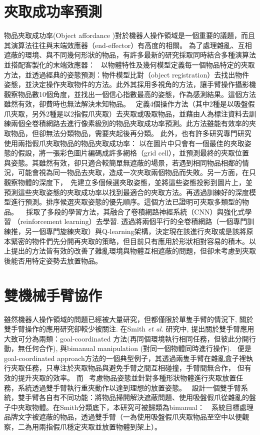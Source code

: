 \section{夾取成功率預測}
物品夾取成功率(Object affordance )對於機器人操作領域是一個重要的議題，而且其演算法往往與末端效應器（end-effector）有高度的相關。
為了處理雜亂、互相遮蔽的環境、與不同幾何形狀的物品，有許多最新的研究採取同時結合多種演算法並搭配客製化的末端效應器：
~\cite{zeng2016multi}以物體特性及幾何模型定義每一個物品特定的夾取方法，並透過經典的姿態預測：物件模型比對（object registration）去找出物件姿態，並決定操作夾取物件的方法。此外其採用多視角的方法，讓手臂操作攝影機觀察物品數10個角度，並找出一個信心指數最高的姿態，作為感測結果。這個方法雖然有效，卻費時也無法解決未知物品。
~\cite{zeng2018robotic}定義4個操作方法（其中2種是以吸盤假爪夾取，另外2種是以2指假爪夾取）去夾取或吸取物品，並藉由人為標注資料去訓練兩個全卷積網路去進行像素級別的物品夾取成功率預測。此方法雖能有效率的夾取物品，但卻無法分類物品，需要夾起後再分類。
此外，也有許多研究專門研究使用兩指假爪夾取物品的物品夾取成功率： \cite{redmon2015real} 以在圖片中只會有一個最佳的夾取姿態的假設，將一張彩色圖片編碼成許多網格（grid cell），並預測最終的夾取位置與姿態。其雖然有效，卻只適合較簡單無遮蔽的場景，若遇到相同物品相鄰的情況，可能會視為同一物品去夾取，造成一次夾取兩個物品而失敗。另一方面，在只觀察物體的深度下，~\cite{mahler2017dex}先建立多個候選夾取姿態，並將這些姿態投影到圖片上，並預測這些夾取姿態的夾取成功率以找到最適合的夾取方法。再透過訓練好的深度模型進行預測。排序候選夾取姿態的優先順序。這個方法已證明可夾取多類型的物品。
~\cite{pinto2016supersizing} 採取了多段的學習方法，其融合了卷積網路神經系統（CNN）與強化式學習 （reinforcement learning）去學習. \cite{zeng2018learning}透過將兩個平行的全卷積網路（一個專門訓練推，另一個專門旋練夾取）與Q-learning架構，決定現在該進行夾取或是該將原本緊密的物件們先分開再夾取的策略，但目前只有應用於形狀相對容易的積木。以上提出的方法皆有效的改善了雜亂環境與物體互相遮蔽的問題，但卻未考慮到夾取後能否用特定姿勢去放置物品。

\section{雙機械手臂協作}
雖然機器人操作領域的問題已經被大量研究，但都僅限於單隻手臂的情況下, 關於雙手臂操作的應用研究卻較少被關注. 在Smith \textit{et al.} \cite{smith2012dual}研究中,
提出關於雙手臂應用大致可分為兩類：goal-coordinated 方法(再同個環境執行相同任務，但彼此分開行動，無任何合作), 與bimanual manipulation (對同一個物體同時進行操作).
~\cite{schwarz2018fast}便是goal-coordinated approach方法的一個典型例子，其透過兩隻手臂在雜亂盒子裡執行夾取任務，只專注於夾取物品與避免手臂之間互相碰撞，手臂間無合作，
但有效的提升夾取的效率。 而~\cite{harada2012pick} 考慮物品姿態並針對多種形狀物體進行夾取放置任務，系統透過雙手臂執行重夾動作以達到理想的放置姿態。
~\cite{miyazaki2017object}設計一個雙手臂系統，雙手臂各自有不同功能：將物品掃開解決遮蔽問題、使用吸盤假爪從雜亂的盤子中夾取物體。在Smith分類底下，本研究可被歸類為bimanual：　系統目標處理品牌文字被遮蔽的物品，透過雙手臂（一為使用吸盤假爪夾取物品至空中以便觀察，二為用兩指假爪穩定夾取並放置物體到架上）。

